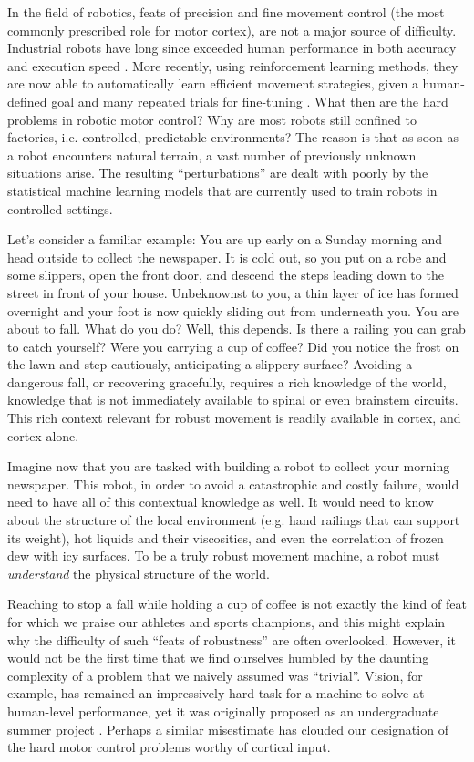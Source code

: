 In the field of robotics, feats of precision and fine movement control (the most commonly prescribed role for motor cortex), are not a major source of difficulty. Industrial robots have long since exceeded human performance in both accuracy and execution speed \cite{Senoo2009}. More recently, using reinforcement learning methods, they are now able to automatically learn efficient movement strategies, given a human-defined goal and many repeated trials for fine-tuning \cite{Coates2008}. What then are the hard problems in robotic motor control? Why are most robots still confined to factories, i.e. controlled, predictable environments? The reason is that as soon as a robot encounters natural terrain, a vast number of previously unknown situations arise. The resulting ``perturbations'' are dealt with poorly by the statistical machine learning models that are currently used to train robots in controlled settings.

Let’s consider a familiar example: You are up early on a Sunday morning and head outside to collect the newspaper. It is cold out, so you put on a robe and some slippers, open the front door, and descend the steps leading down to the street in front of your house. Unbeknownst to you, a thin layer of ice has formed overnight and your foot is now quickly sliding out from underneath you. You are about to fall. What do you do? Well, this depends. Is there a railing you can grab to catch yourself? Were you carrying a cup of coffee? Did you notice the frost on the lawn and step cautiously, anticipating a slippery surface? Avoiding a dangerous fall, or recovering gracefully, requires a rich knowledge of the world, knowledge that is not immediately available to spinal or even brainstem circuits. This rich context relevant for robust movement is readily available in cortex, and cortex alone.

Imagine now that you are tasked with building a robot to collect your morning newspaper. This robot, in order to avoid a catastrophic and costly failure, would need to have all of this contextual knowledge as well. It would need to know about the structure of the local environment (e.g. hand railings that can support its weight), hot liquids and their viscosities, and even the correlation of frozen dew with icy surfaces. To be a truly robust movement machine, a robot must \emph{understand} the physical structure of the world.

Reaching to stop a fall while holding a cup of coffee is not exactly the kind of feat for which we praise our athletes and sports champions, and this might explain why the difficulty of such ``feats of robustness'' are often overlooked. However, it would not be the first time that we find ourselves humbled by the daunting complexity of a problem that we naively assumed was ``trivial''. Vision, for example, has remained an impressively hard task for a machine to solve at human-level performance, yet it was originally proposed as an undergraduate summer project \cite{Papert1966}. Perhaps a similar misestimate has clouded our designation of the hard motor control problems worthy of cortical input.

